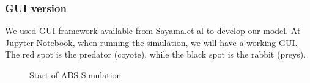 \documentclass{article}
\begin{document}
\begin{normalsize}
\subsubsection{GUI version}
We used GUI framework available from Sayama.et al \cite{Sayama2013} to develop our model.
At Jupyter Notebook, when running the simulation, we will have a working GUI. The red spot is the predator (coyote), while the black spot is the rabbit (preys).
\begin{figure}[H]
	\caption{Start of ABS Simulation}
\end{figure}

\newpage

\end{normalsize}
\end{document}
